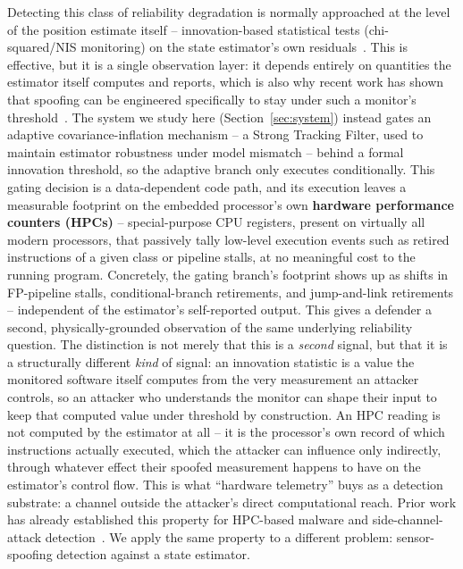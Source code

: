 \documentclass[conference]{IEEEtran}
\begin{document}
Detecting this class of reliability degradation is normally approached at the level of the position estimate itself -- innovation-based statistical tests (chi-squared/NIS monitoring) on the state estimator's own residuals~\cite{todo_nis_detection}. This is effective, but it is a single observation layer: it depends entirely on quantities the estimator itself computes and reports, which is also why recent work has shown that spoofing can be engineered specifically to stay under such a monitor's threshold~\cite{todo_adversarial_kf}. The system we study here (Section~\ref{sec:system}) instead gates an adaptive covariance-inflation mechanism -- a Strong Tracking Filter, used to maintain estimator robustness under model mismatch -- behind a formal innovation threshold, so the adaptive branch only executes conditionally. This gating decision is a data-dependent code path, and its execution leaves a measurable footprint on the embedded processor's own \textbf{hardware performance counters (HPCs)} -- special-purpose CPU registers, present on virtually all modern processors, that passively tally low-level execution events such as retired instructions of a given class or pipeline stalls, at no meaningful cost to the running program. Concretely, the gating branch's footprint shows up as shifts in FP-pipeline stalls, conditional-branch retirements, and jump-and-link retirements -- independent of the estimator's self-reported output. This gives a defender a second, physically-grounded observation of the same underlying reliability question. The distinction is not merely that this is a \emph{second} signal, but that it is a structurally different \emph{kind} of signal: an innovation statistic is a value the monitored software itself computes from the very measurement an attacker controls, so an attacker who understands the monitor can shape their input to keep that computed value under threshold by construction. An HPC reading is not computed by the estimator at all -- it is the processor's own record of which instructions actually executed, which the attacker can influence only indirectly, through whatever effect their spoofed measurement happens to have on the estimator's control flow. This is what ``hardware telemetry'' buys as a detection substrate: a channel outside the attacker's direct computational reach. Prior work has already established this property for HPC-based malware and side-channel-attack detection~\cite{demme2013feasibility,carna2023fight}. We apply the same property to a different problem: sensor-spoofing detection against a state estimator.
\end{document}

